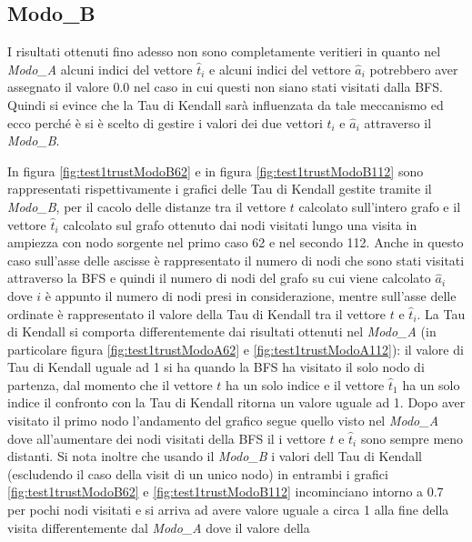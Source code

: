 \subsection{Modo\_B}
I risultati ottenuti fino adesso non sono completamente veritieri in quanto nel \textit{Modo\_A} alcuni indici del  vettore \(\hat{t}_i\) e alcuni indici del vettore \(\hat{a}_i\) potrebbero aver assegnato il valore 0.0 nel caso in cui questi non siano stati visitati dalla BFS. Quindi si evince che la Tau di Kendall sarà influenzata da tale meccanismo ed ecco perché è si è scelto di gestire i valori dei due vettori \(\hat{t}_i\) e \(\hat{a}_i\) attraverso il \textit{Modo\_B}.

In figura \ref{fig:test1trustModoB62} e in figura \ref{fig:test1trustModoB112} sono rappresentati rispettivamente i grafici delle Tau di Kendall gestite tramite il \textit{Modo\_B}, per il cacolo delle distanze tra il vettore \(t\) calcolato sull'intero grafo e il vettore \(\hat{t}_i\) calcolato sul grafo ottenuto dai nodi visitati lungo una visita in ampiezza con nodo sorgente nel primo caso 62 e nel secondo 112.  Anche in questo caso sull'asse delle ascisse è rappresentato il numero di nodi che sono stati visitati attraverso la BFS e quindi il numero di nodi del grafo su cui viene calcolato \(\hat{a}_i\) dove \(i\) è appunto il numero di nodi presi in considerazione, mentre sull'asse delle ordinate è rappresentato il valore della Tau di Kendall tra il vettore \(t\) e \(\hat{t}_i\).
La Tau di Kendall si comporta differentemente dai risultati ottenuti nel \textit{Modo\_A} (in particolare figura \ref{fig:test1trustModoA62} e \ref{fig:test1trustModoA112}): il valore di Tau di Kendall uguale ad 1 si ha quando la BFS ha visitato il solo nodo di partenza, dal momento che il vettore \(t\) ha un solo indice e il vettore \(\hat{t}_1\) ha un solo indice il confronto con la Tau di Kendall ritorna un valore uguale ad 1. Dopo aver visitato il primo nodo l'andamento del grafico segue quello visto nel \textit{Modo\_A} dove all'aumentare dei nodi visitati della BFS il i vettore \(t\) e \(\hat{t}_i\) sono sempre meno distanti. Si nota inoltre che usando il \textit{Modo\_B} i valori dell Tau di Kendall (escludendo il caso della visit di un unico nodo) in entrambi i grafici \ref{fig:test1trustModoB62} e \ref{fig:test1trustModoB112} incominciano intorno a 0.7 per pochi nodi visitati e si arriva ad avere valore uguale a circa 1 alla fine della visita differentemente dal \textit{Modo\_A} dove il valore della 
